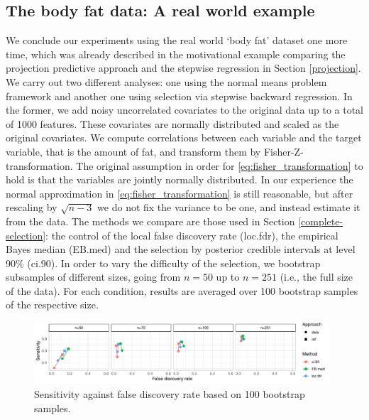 \documentclass[american,]{article}
\theoremstyle{definition}
\begin{document}
\hypertarget{real-world-data}{%
\subsection{The body fat data: A real world example}\label{real-world-data}}

We conclude our experiments using the real world `body fat' dataset
one more time, which was already described in the motivational example
comparing the projection predictive approach and the stepwise
regression in Section \ref{projection}. We carry out two different
analyses: one using the normal means problem framework and another one
using selection via stepwise backward regression. In the former, we
add noisy uncorrelated covariates to the original data up to a total
of 1000 features. These covariates are normally distributed and scaled
as the original covariates. We compute correlations between each
variable and the target variable, that is the amount of fat, and
transform them by Fisher-Z-transformation. The original assumption in
order for \eqref{eq:fisher_transformation} to hold is that the
variables are jointly normally distributed. In our experience the
normal approximation in \eqref{eq:fisher_transformation} is still
reasonable, but after rescaling by $\sqrt{n-3}$ we do not fix the
variance to be one, and instead estimate it from the data. The methods
we compare are those used in Section \ref{complete-selection}: the
control of the local false discovery rate (loc.fdr), the empirical
Bayes median (EB.med) and the selection by posterior credible
intervals at level 90\% (ci.90).  In order to vary the difficulty of
the selection, we bootstrap subsamples of different sizes, going from
$n=50$ up to $n=251$ (i.e., the full size of the data). For each
condition, results are averaged over 100 bootstrap samples of the
respective size.

\begin{figure}[tp]
  \centering
  \includegraphics[width=0.98\textwidth]{graphics/bodyfat_sensitivity_vs_fdr.pdf}
  \caption{Sensitivity against false discovery rate based on 100 bootstrap samples.\\}
  \label{fig:bodyfat_sensitivity_vs_fdr}
\end{figure}
\end{document}
